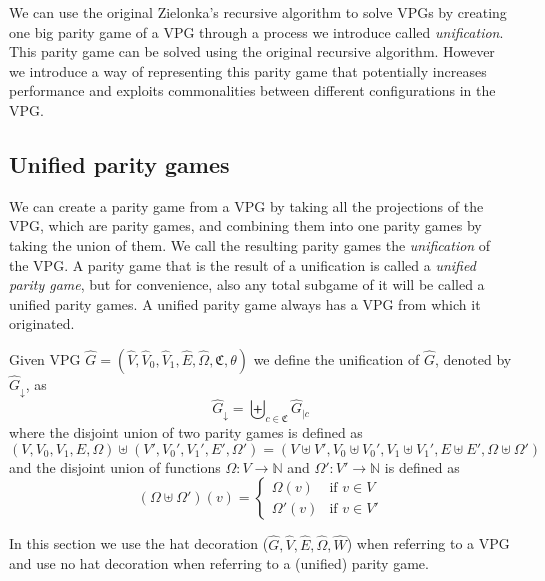 We can use the original Zielonka's recursive algorithm to solve VPGs by creating one big parity game of a VPG through a process we introduce called \textit{unification}. This parity game can be solved using the original recursive algorithm. However we introduce a way of representing this parity game that potentially increases performance and exploits commonalities between different configurations in the VPG.

\subsection{Unified parity games}
We can create a parity game from a VPG by taking all the projections of the VPG, which are parity games, and combining them into one parity games by taking the union of them. We call the resulting parity games the \textit{unification} of the VPG. A parity game that is the result of a unification is called a \textit{unified parity game}, but for convenience, also any total subgame of it will be called a unified parity games. A unified parity game always has a VPG from which it originated.
\begin{definition}
	Given VPG $\hat{G} = (\hat{V},\hat{V}_0,\hat{V}_1, \hat{E},\hat{\Omega}, \mathfrak{C},\theta)$ we define the unification of $\hat{G}$, denoted by $\hat{G}_{\downarrow}$, as
	\[  \hat{G}_{\downarrow} = \biguplus_{c\in \mathfrak{C}}\hat{G}_{|c} \]
	where the disjoint union of two parity games is defined as
	\[ (V,V_0,V_1,E,\Omega) \uplus (V',V_0',V_1',E',\Omega') = (V \uplus V', V_0 \uplus V_0', V_1 \uplus V_1', E \uplus E', \Omega \uplus \Omega') \]
	and the disjoint union of functions $\Omega : V \rightarrow \mathbb{N}$ and $\Omega' : V' \rightarrow \mathbb{N}$ is defined as
	\[ (\Omega \uplus \Omega')(v) = \begin{cases}
	\Omega(v) & \text{if }v \in V \\
	\Omega'(v) & \text{if }v \in V'
	\end{cases}\]
\end{definition}
In this section we use the hat decoration ($\hat{G},\hat{V},\hat{E},\hat{\Omega},\hat{W}$) when referring to a VPG and use no hat decoration when referring to a (unified) parity game.

